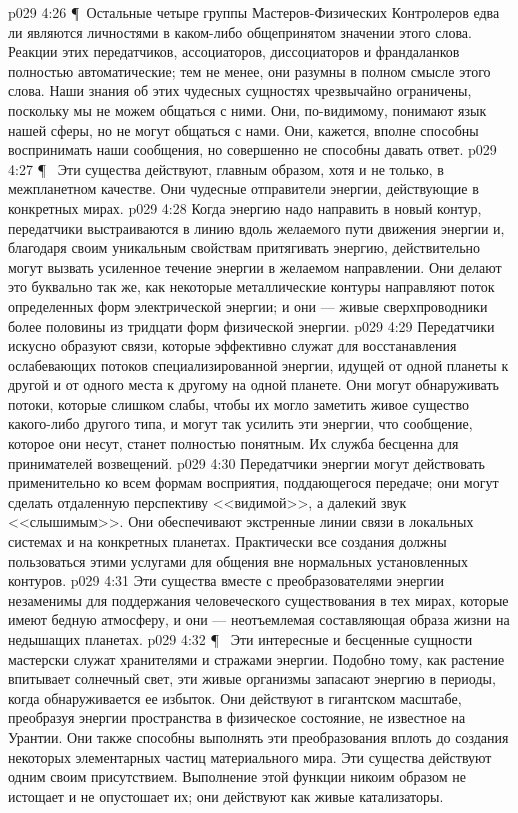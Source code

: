 \vs p029 4:26 \P\ Остальные четыре группы Мастеров\hyp{}Физических Контролеров едва ли являются личностями в каком\hyp{}либо общепринятом значении этого слова. Реакции этих передатчиков, ассоциаторов, диссоциаторов и франдаланков полностью автоматические; тем не менее, они разумны в полном смысле этого слова. Наши знания об этих чудесных сущностях чрезвычайно ограничены, поскольку мы не можем общаться с ними. Они, по\hyp{}видимому, понимают язык нашей сферы, но не могут общаться с нами. Они, кажется, вполне способны воспринимать наши сообщения, но совершенно не способны давать ответ.
\vs p029 4:27 \P\ \bibnobreakspace {} Эти существа действуют, главным образом, хотя и не только, в межпланетном качестве. Они чудесные отправители энергии, действующие в конкретных мирах.
\vs p029 4:28 Когда энергию надо направить в новый контур, передатчики выстраиваются в линию вдоль желаемого пути движения энергии и, благодаря своим уникальным свойствам притягивать энергию, действительно могут вызвать усиленное течение энергии в желаемом направлении. Они делают это буквально так же, как некоторые металлические контуры направляют поток определенных форм электрической энергии; и они --- живые сверхпроводники более половины из тридцати форм физической энергии.
\vs p029 4:29 Передатчики искусно образуют связи, которые эффективно служат для восстанавления ослабевающих потоков специализированной энергии, идущей от одной планеты к другой и от одного места к другому на одной планете. Они могут обнаруживать потоки, которые слишком слабы, чтобы их могло заметить живое существо какого\hyp{}либо другого типа, и могут так усилить эти энергии, что сообщение, которое они несут, станет полностью понятным. Их служба бесценна для принимателей возвещений.
\vs p029 4:30 Передатчики энергии могут действовать применительно ко всем формам восприятия, поддающегося передаче; они могут сделать отдаленную перспективу <<видимой>>, а далекий звук <<слышимым>>. Они обеспечивают экстренные линии связи в локальных системах и на конкретных планетах. Практически все создания должны пользоваться этими услугами для общения вне нормальных установленных контуров.
\vs p029 4:31 Эти существа вместе с преобразователями энергии незаменимы для поддержания человеческого существования в тех мирах, которые имеют бедную атмосферу, и они --- неотъемлемая составляющая образа жизни на недышащих планетах.
\vs p029 4:32 \P\ \bibnobreakspace {} Эти интересные и бесценные сущности мастерски служат хранителями и стражами энергии. Подобно тому, как растение впитывает солнечный свет, эти живые организмы запасают энергию в периоды, когда обнаруживается ее избыток. Они действуют в гигантском масштабе, преобразуя энергии пространства в физическое состояние, не известное на Урантии. Они также способны выполнять эти преобразования вплоть до создания некоторых элементарных частиц материального мира. Эти существа действуют одним своим присутствием. Выполнение этой функции никоим образом не истощает и не опустошает их; они действуют как живые катализаторы.
